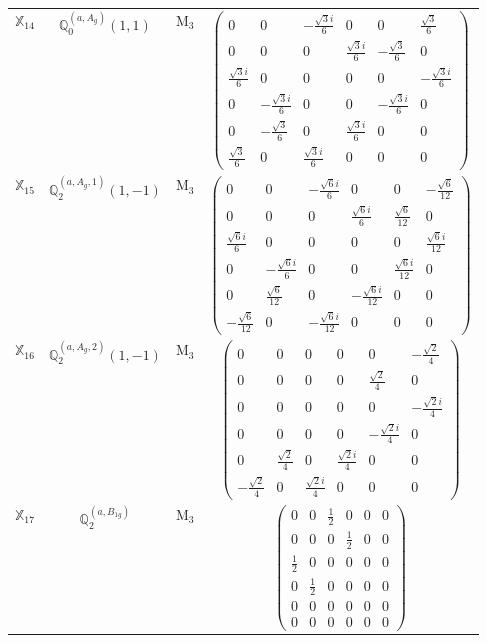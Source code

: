 \documentclass[fleqn,10pt,landscape]{article}
\begin{document}
\begin{itemize}
\begin{center}
\begin{longtable}{c|c|c|c}
$ \mathbb{X}_{14} $ & $\mathbb{Q}_{0}^{(a,A_{g})}(1,1)$ & M$_{3}$ & $\begin{pmatrix} 0 & 0 & - \frac{\sqrt{3} i}{6} & 0 & 0 & \frac{\sqrt{3}}{6} \\ 0 & 0 & 0 & \frac{\sqrt{3} i}{6} & - \frac{\sqrt{3}}{6} & 0 \\ \frac{\sqrt{3} i}{6} & 0 & 0 & 0 & 0 & - \frac{\sqrt{3} i}{6} \\ 0 & - \frac{\sqrt{3} i}{6} & 0 & 0 & - \frac{\sqrt{3} i}{6} & 0 \\ 0 & - \frac{\sqrt{3}}{6} & 0 & \frac{\sqrt{3} i}{6} & 0 & 0 \\ \frac{\sqrt{3}}{6} & 0 & \frac{\sqrt{3} i}{6} & 0 & 0 & 0 \end{pmatrix}$ \\
$ \mathbb{X}_{15} $ & $\mathbb{Q}_{2}^{(a,A_{g},1)}(1,-1)$ & M$_{3}$ & $\begin{pmatrix} 0 & 0 & - \frac{\sqrt{6} i}{6} & 0 & 0 & - \frac{\sqrt{6}}{12} \\ 0 & 0 & 0 & \frac{\sqrt{6} i}{6} & \frac{\sqrt{6}}{12} & 0 \\ \frac{\sqrt{6} i}{6} & 0 & 0 & 0 & 0 & \frac{\sqrt{6} i}{12} \\ 0 & - \frac{\sqrt{6} i}{6} & 0 & 0 & \frac{\sqrt{6} i}{12} & 0 \\ 0 & \frac{\sqrt{6}}{12} & 0 & - \frac{\sqrt{6} i}{12} & 0 & 0 \\ - \frac{\sqrt{6}}{12} & 0 & - \frac{\sqrt{6} i}{12} & 0 & 0 & 0 \end{pmatrix}$ \\
$ \mathbb{X}_{16} $ & $\mathbb{Q}_{2}^{(a,A_{g},2)}(1,-1)$ & M$_{3}$ & $\begin{pmatrix} 0 & 0 & 0 & 0 & 0 & - \frac{\sqrt{2}}{4} \\ 0 & 0 & 0 & 0 & \frac{\sqrt{2}}{4} & 0 \\ 0 & 0 & 0 & 0 & 0 & - \frac{\sqrt{2} i}{4} \\ 0 & 0 & 0 & 0 & - \frac{\sqrt{2} i}{4} & 0 \\ 0 & \frac{\sqrt{2}}{4} & 0 & \frac{\sqrt{2} i}{4} & 0 & 0 \\ - \frac{\sqrt{2}}{4} & 0 & \frac{\sqrt{2} i}{4} & 0 & 0 & 0 \end{pmatrix}$ \\
$ \mathbb{X}_{17} $ & $\mathbb{Q}_{2}^{(a,B_{1g})}$ & M$_{3}$ & $\begin{pmatrix} 0 & 0 & \frac{1}{2} & 0 & 0 & 0 \\ 0 & 0 & 0 & \frac{1}{2} & 0 & 0 \\ \frac{1}{2} & 0 & 0 & 0 & 0 & 0 \\ 0 & \frac{1}{2} & 0 & 0 & 0 & 0 \\ 0 & 0 & 0 & 0 & 0 & 0 \\ 0 & 0 & 0 & 0 & 0 & 0 \end{pmatrix}$ \\

\end{longtable}
\end{center}
\end{itemize}
\end{document}
